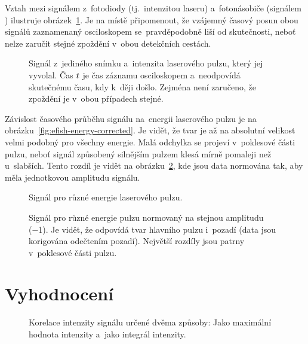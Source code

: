 Vztah mezi signálem z~fotodiody (tj.~intenzitou laseru)
a~fotonásobiče (signálem \EFISH{}) ilustruje
obrázek~\ref{fig:efish-singleshot}.
Je na místě připomenout, že vzájemný časový posun obou signálů
zaznamenaný osciloskopem se~pravděpodobně liší od skutečnosti,
neboť nelze zaručit stejné zpoždění v~obou detekčních cestách.

\begin{figure}[htp]
	\centering
	
	\caption{Signál \EFISH{} z~jediného snímku
		a~intenzita laserového pulzu, který jej vyvolal.
		Čas $t$ je čas záznamu osciloskopem a~neodpovídá skutečnému času,
		kdy k~ději došlo.
		Zejména není zaručeno, že zpoždění je v~obou případech stejné.}
	\label{fig:efish-singleshot}
\end{figure}

Závislost časového průběhu signálu \EFISH{} na~energii laserového pulzu
je na obrázku~\ref{fig:efish-energy-corrected}.
Je vidět, že tvar je až na absolutní velikost velmi podobný pro všechny
energie.
Malá odchylka se projeví v~poklesové části pulzu, neboť signál způsobený
silnějším pulzem klesá mírně pomaleji než u~slabších.
Tento rozdíl je vidět na obrázku~\ref{fig:efish-energy-norm},
kde jsou data normována tak, aby měla jednotkovou amplitudu signálu.

\begin{figure}[htp]
	\centering
	
	\caption{Signál \EFISH{} pro různé energie laserového pulzu.}
	\label{fig:efish-energy-corrected}
	\vspace{24pt}
	
	\caption{Signál \EFISH{} pro různé energie pulzu normovaný na stejnou
		amplitudu (\num{-1}).
		Je vidět, že odpovídá tvar hlavního pulzu i~pozadí
		(data jsou korigována odečtením pozadí).
		Největší rozdíly jsou patrny v~poklesové části pulzu.}
	\label{fig:efish-energy-norm}
\end{figure}

\section{Vyhodnocení}
\label{sec:efish-method}

\begin{figure}[htp]
	\centering
	
	\caption{Korelace intenzity signálu \EFISH{} určené dvěma způsoby:
		Jako maximální hodnota intenzity a~jako integrál intenzity.}
	\label{fig:efish-intmax}
\end{figure}

